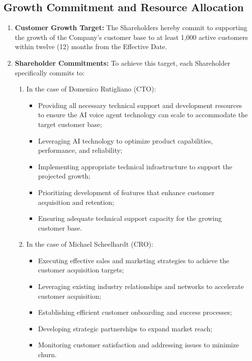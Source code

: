 \subsection{Growth Commitment and Resource Allocation}
\begin{enumerate}[label=(\alph*), wide, labelwidth=!, labelindent=0pt]
\item \textbf{Customer Growth Target:} The Shareholders hereby commit to supporting the growth of the Company's customer base to at least 1,000 active customers within twelve (12) months from the Effective Date.
\item \textbf{Shareholder Commitments:} To achieve this target, each Shareholder specifically commits to:
    \begin{enumerate}[label=(\roman*)]
    \item In the case of Domenico Rutigliano (CTO):
        \begin{itemize}
        \item Providing all necessary technical support and development resources to ensure the AI voice agent technology can scale to accommodate the target customer base;
        \item Leveraging AI technology to optimize product capabilities, performance, and reliability;
        \item Implementing appropriate technical infrastructure to support the projected growth;
        \item Prioritizing development of features that enhance customer acquisition and retention;
        \item Ensuring adequate technical support capacity for the growing customer base.
        \end{itemize}
    \item In the case of Michael Scheelhardt (CRO):
        \begin{itemize}
        \item Executing effective sales and marketing strategies to achieve the customer acquisition targets;
        \item Leveraging existing industry relationships and networks to accelerate customer acquisition;
        \item Establishing efficient customer onboarding and success processes;
        \item Developing strategic partnerships to expand market reach;
        \item Monitoring customer satisfaction and addressing issues to minimize churn.
        \end{itemize}

\end{enumerate}
\end{enumerate}
